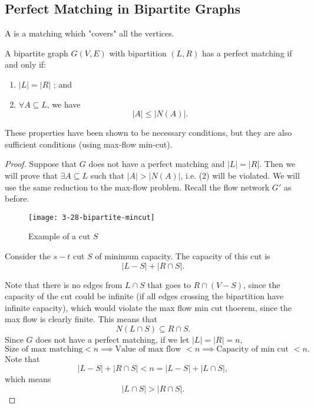 \documentclass[../main/main.tex]{subfiles}
\begin{document}
	\subsection{Perfect Matching in Bipartite Graphs}

\begin{definition}
	A  is a matching which "covers" all the vertices.
\end{definition}
\begin{theorem}
	A bipartite graph $G(V,E)$ with bipartition $\left( L,R \right) $ has a perfect matching if and only if: 
	\begin{enumerate}
		\item $|L|=|R|$ ; and 
		\item $\forall A\subseteq L$, we have \[
				|A|\le |N(A)|
		.\]  
	\end{enumerate}
	These properties have been shown to be necessary conditions, but they are also sufficient conditions (using max-flow min-cut).
\end{theorem}

\begin{proof}
	Suppose that $G$ does not have a perfect matching and  $|L|=|R|$. Then we will prove that  $\exists A\subseteq L$ such that $|A|>|N(A)|$, i.e. (2) will be violated. We will use the same reduction to the max-flow problem. Recall the flow network $G'$ as before.
	\begin{figure}[h!]
		\centering
		\texttt{[image: 3-28-bipartite-mincut]}
		\caption{Example of a cut $S$}
		\label{fig:}
	\end{figure}

	Consider the $s-t$ cut $S$ of minimum capacity. The capacity of this cut is \[
	|L-S|+|R\cap S|
	.\] 

	Note that there is no edges from $L\cap S$ that goes to $R\cap (V-S)$, since the capacity of the cut could be infinite (if all edges crossing the bipartition have infinite capacity), which would violate the max flow min cut thoerem, since the max flow is clearly finite. This means that  \[
		N(L\cap S)\subseteq R\cap S
	.\]
	Since $G$ does not have a perfect matching, if we let $|L|=|R|=n$,  \[
	\text{Size of max matching}<n \implies \text{Value of max flow }< n\implies \text{Capacity of min cut }<n 
	.\] 
	Note that \[
	|L-S|+|R\cap S|<n=|L-S|+|L\cap S|
	,\] which means \[
	|L\cap S|>|R\cap S| 
	.\]  
\end{proof}
\end{document}
